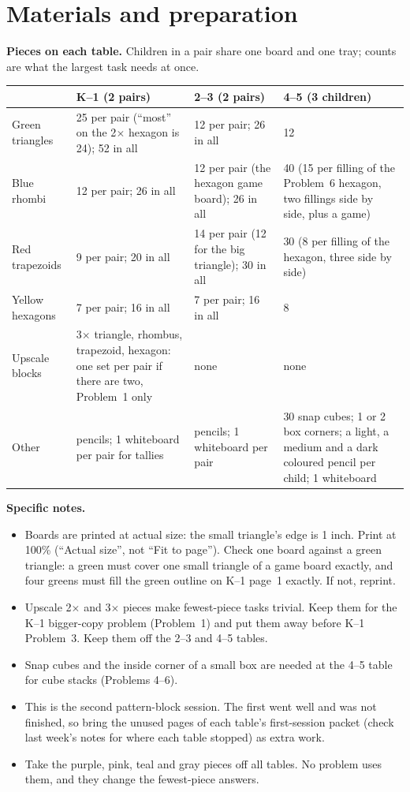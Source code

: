 \documentclass[10pt]{article}
\begin{document}
\section{Materials and preparation}

\textbf{Pieces on each table.} Children in a pair share one board and one tray; counts are what the largest task needs at once.

\begin{xltabular}{\linewidth}{L{1.25in} Y Y Y}
\toprule
 & \textbf{K--1} (2 pairs) & \textbf{2--3} (2 pairs) & \textbf{4--5} (3 children)\\
\midrule
Green triangles & 25 per pair (``most'' on the 2$\times$ hexagon is 24); 52 in all & 12 per pair; 26 in all & 12\\
Blue rhombi & 12 per pair; 26 in all & 12 per pair (the hexagon game board); 26 in all & 40 (15 per filling of the Problem~6 hexagon, two fillings side by side, plus a game)\\
Red trapezoids & 9 per pair; 20 in all & 14 per pair (12 for the big triangle); 30 in all & 30 (8 per filling of the hexagon, three side by side)\\
Yellow hexagons & 7 per pair; 16 in all & 7 per pair; 16 in all & 8\\
Upscale blocks & 3$\times$ triangle, rhombus, trapezoid, hexagon: one set per pair if there are two, Problem~1 only & none & none\\
Other & pencils; 1 whiteboard per pair for tallies & pencils; 1 whiteboard per pair & 30 snap cubes; 1 or 2 box corners; a light, a medium and a dark coloured pencil per child; 1 whiteboard\\
\bottomrule
\end{xltabular}

\textbf{Specific notes.}
\begin{itemize}
\item Boards are printed at actual size: the small triangle's edge is 1 inch. Print at 100\% (``Actual size'', not ``Fit to page''). Check one board against a green triangle: a green must cover one small triangle of a game board exactly, and four greens must fill the green outline on K--1 page~1 exactly. If not, reprint.
\item Upscale 2$\times$ and 3$\times$ pieces make fewest-piece tasks trivial. Keep them for the K--1 bigger-copy problem (Problem~1) and put them away before K--1 Problem~3. Keep them off the 2--3 and 4--5 tables.
\item Snap cubes and the inside corner of a small box are needed at the 4--5 table for cube stacks (Problems 4--6).
\item This is the second pattern-block session. The first went well and was not finished, so bring the unused pages of each table's first-session packet (check last week's notes for where each table stopped) as extra work.
\item Take the purple, pink, teal and gray pieces off all tables. No problem uses them, and they change the fewest-piece answers.
\end{itemize}
\end{document}
